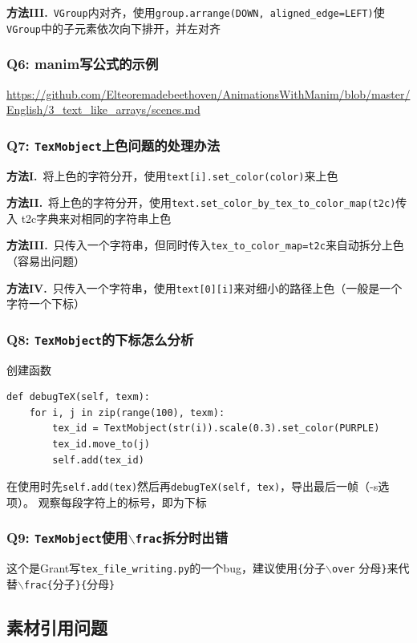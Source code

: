 \documentclass[UTF8]{ctexart}
\begin{document}
\textbf{方法III.}\ \texttt{VGroup}内对齐，使用\texttt{group.arrange(DOWN, aligned\_edge=LEFT)}使
\texttt{VGroup}中的子元素依次向下排开，并左对齐

\subsubsection*{Q6: manim写公式的示例}
\url{https://github.com/Elteoremadebeethoven/AnimationsWithManim/blob/master/English/3\_text\_like\_arrays/scenes.md}

\subsubsection*{Q7: \texttt{TexMobject}上色问题的处理办法}
\textbf{方法I.}\ 将上色的字符分开，使用\texttt{text[i].set\_color(color)}来上色

\textbf{方法II.}\ 将上色的字符分开，使用\texttt{text.set\_color\_by\_tex\_to\_color\_map(t2c)}传入
t2c字典来对相同的字符串上色

\textbf{方法III.}\ 只传入一个字符串，但同时传入\texttt{tex\_to\_color\_map=t2c}来自动拆分上色（容易出问题）

\textbf{方法IV.}\ 只传入一个字符串，使用\texttt{text[0][i]}来对细小的路径上色（一般是一个字符一个下标）

\subsubsection*{Q8: \texttt{TexMobject}的下标怎么分析}
创建函数
\begin{lstlisting}
def debugTeX(self, texm):
    for i, j in zip(range(100), texm):
        tex_id = TextMobject(str(i)).scale(0.3).set_color(PURPLE)
        tex_id.move_to(j)
        self.add(tex_id)
\end{lstlisting}
在使用时先\texttt{self.add(tex)}然后再\texttt{debugTeX(self, tex)}，导出最后一帧（-s选项）。
观察每段字符上的标号，即为下标

\subsubsection*{Q9: \texttt{TexMobject}使用\texttt{$\backslash$frac}拆分时出错}
这个是Grant写\texttt{tex\_file\_writing.py}的一个bug，建议使用\texttt{\{}分子\texttt{$\backslash$over}
分母\texttt{\}}来代替\texttt{$\backslash$frac\{}分子\texttt{\}\{}分母\texttt{\}}


\subsection{素材引用问题}
\end{document}
